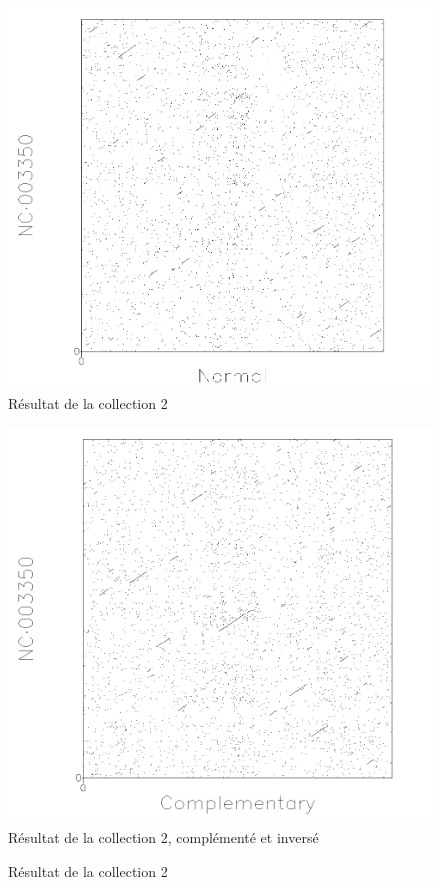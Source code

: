 \begin{figure}[!ht]
	\begin{minipage}[r]{.46\linewidth}
		\begin{center}
		\includegraphics[scale=0.25]{../res/cible2.png}
		Résultat de la collection 2
	\end{center}
\end{minipage} \hfill
\begin{minipage}[c]{.46 \linewidth}
	\begin{center}
			\includegraphics[scale=0.25]{../res/cible2-ic.png}
			Résultat de la collection 2, complémenté et inversé
		\end{center}
	\end{minipage}
	\caption{Résultat de la collection 2}
\end{figure}

